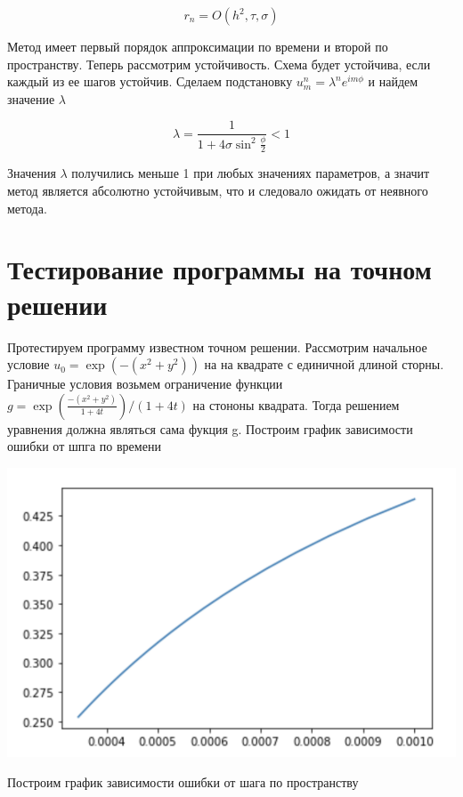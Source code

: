 \documentclass[a4paper]{article}
\begin{document}
\begin{equation}
	r_n = O(h^2, \tau, \sigma)
\end{equation}

Метод имеет первый порядок аппроксимации по времени и второй по пространству. Теперь рассмотрим устойчивость. Схема будет устойчива, если каждый из ее шагов устойчив. Сделаем подстановку $u_{m}^{n} = \lambda^n e^{i m \phi}$ и найдем значение $\lambda$

\begin{equation}
	\lambda = \frac{1}{1 + 4 \sigma \sin^2{\frac{\phi}{2}}} < 1 
\end{equation}

Значения $\lambda$ получились меньше 1 при любых значениях параметров, а значит метод является абсолютно устойчивым, что и следовало ожидать от неявного метода.

\section{Тестирование программы на точном решении}
Протестируем программу известном точном решении. Рассмотрим начальное условие $u_0 = \exp(-(x^2 + y^2))$ на на квадрате с единичной длиной сторны. Граничные условия возьмем ограничение функции $g = \exp(\frac{-(x^2 + y^2)}{1 + 4 t}) / (1 + 4 t)$ на стононы квадрата. Тогда решением уравнения должна являться сама фукция g. Построим график зависимости ошибки от шпга по времени 

\begin{center}
	\includegraphics{1.png}
\end{center}

Построим график зависимости ошибки от шага по пространству 
\end{document}
